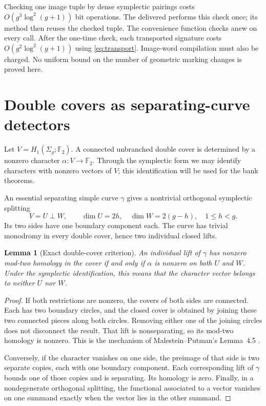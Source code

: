 \documentclass[11pt,letterpaper]{article}
\newtheorem{lemma}[lemma]{Lemma}
\theoremstyle{definition}
\theoremstyle{remark}
\newcommand{\F}{\mathbb F_2}
\newcommand{\code}[1]{\texttt{\detokenize{#1}}}
\begin{document}
Checking one image tuple by dense symplectic pairings costs
$O(g^3\log^2(g+1))$ bit operations. The delivered \code{TransportPlan} performs this check once; its \code{apply} method then reuses the checked tuple. The convenience function \code{transport} checks anew on every call. After the one-time check, each transported signature costs $O(g^2\log^2(g+1))$ using \eqref{eq:transport}. Image-word compilation must also be charged. No uniform bound on the number of geometric marking changes is proved here.

\section{Double covers as separating-curve detectors}
\label{sec:covers}
Let $V=H_1(\Sigma_g;\F)$. A connected unbranched double cover is determined by a nonzero character $\alpha:V\to\F$. Through the symplectic form we may identify characters with nonzero vectors of $V$; this identification will be used for the bank theorems.

An essential separating simple curve $\gamma$ gives a nontrivial orthogonal symplectic splitting
\begin{equation}\label{eq:splitting}
 V=U\perp W,
 \qquad \dim U=2h,\quad\dim W=2(g-h),\quad 1\le h<g.
\end{equation}
Its two sides have one boundary component each. The curve has trivial monodromy in every double cover, hence two individual closed lifts.

\begin{lemma}[Exact double-cover criterion]\label{lem:covercriterion}
An individual lift of $\gamma$ has nonzero mod-two homology in the cover if and only if $\alpha$ is nonzero on both $U$ and $W$. Under the symplectic identification, this means that the character vector belongs to neither $U$ nor $W$.
\end{lemma}
\begin{proof}
If both restrictions are nonzero, the covers of both sides are connected. Each has two boundary circles, and the closed cover is obtained by joining these two connected pieces along both circles. Removing either one of the joining circles does not disconnect the result. That lift is nonseparating, so its mod-two homology is nonzero. This is the mechanism of Malestein--Putman's Lemma~4.5 \cite{mp}.

Conversely, if the character vanishes on one side, the preimage of that side is two separate copies, each with one boundary component. Each corresponding lift of $\gamma$ bounds one of those copies and is separating. Its homology is zero. Finally, in a nondegenerate orthogonal splitting, the functional associated to a vector vanishes on one summand exactly when the vector lies in the other summand.
\end{proof}
\end{document}
